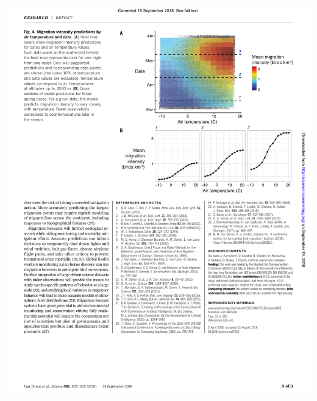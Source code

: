 \documentclass[a4paper, twoside]{templates/ociamthesis}
\begin{document}
\includegraphics[width=1\linewidth]{pdf_chapters/forecast/forecast_crop_Part3}
\end{document}
